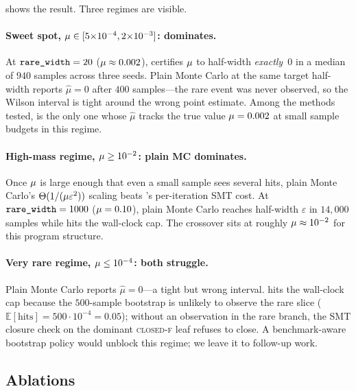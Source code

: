  shows the result.  Three regimes are
visible.

\paragraph{Sweet spot, $\mu \in [5{\times}10^{-4},
  2{\times}10^{-3}]$: \toolname{} dominates.}
At $\texttt{rare\_width} = 20$ ($\mu \approx 0.002$),
 certifies $\mu$ to half-width
\emph{exactly~$0$} in a median of $940$ samples across three seeds.
Plain Monte Carlo at the same target half-width reports
$\hat\mu = 0$ after $400$ samples---the rare event was never
observed, so the Wilson interval is tight around the wrong point
estimate.  Among the methods tested, \toolname{} is the only one
whose $\hat\mu$ tracks the true value $\mu = 0.002$ at small
sample budgets in this regime.

\paragraph{High-mass regime, $\mu \ge 10^{-2}$: plain MC
  dominates.}
Once $\mu$ is large enough that even a small sample sees several
hits, plain Monte Carlo's $\Theta(1/(\mu \varepsilon^2))$ scaling
beats \toolname{}'s per-iteration SMT cost.  At
$\texttt{rare\_width} = 1000$ ($\mu = 0.10$), plain Monte Carlo
reaches half-width $\varepsilon$ in $14{,}000$ samples while
\toolname{} hits the wall-clock cap.  The crossover sits at roughly
$\mu \approx 10^{-2}$ for this program structure.

\paragraph{Very rare regime, $\mu \le 10^{-4}$: both struggle.}
Plain Monte Carlo reports $\hat\mu = 0$---a tight but wrong interval.
\toolname{} hits the wall-clock cap because the $500$-sample
bootstrap is unlikely to observe the rare slice
($\mathbb{E}[\text{hits}] = 500 \cdot 10^{-4} = 0.05$); without an
observation in the rare branch, the SMT closure check on the dominant
\textsc{closed-f} leaf refuses to close.  A benchmark-aware
bootstrap policy would unblock this regime; we leave it to follow-up
work.

\subsection{Ablations}\label{sec:ablations}

